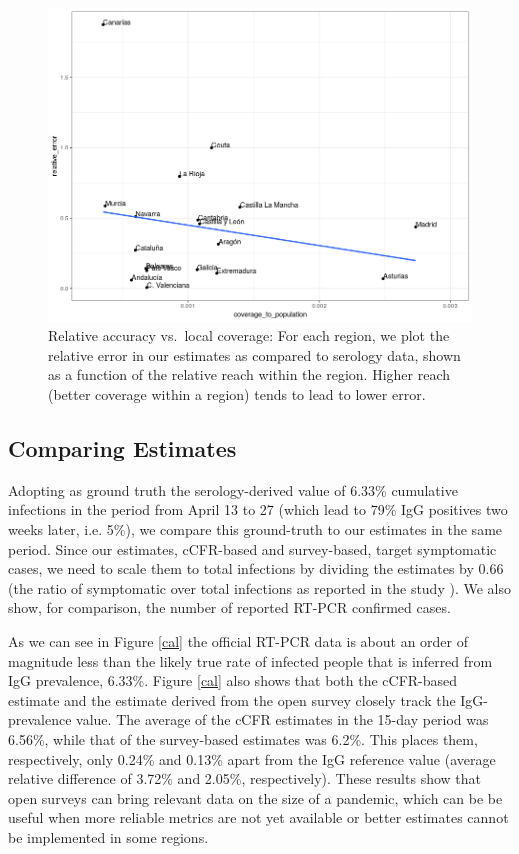 \documentclass{article}
\begin{document}
\begin{figure}[htb]
\begin{center}
\includegraphics[width=0.9\linewidth]{covr1.png}
\end{center}
\caption{Relative accuracy vs.~local coverage: For each region, we plot the relative error in our estimates as compared to serology data, shown as a function of the relative reach within the region. Higher reach (better coverage within a region) tends to lead to lower error. }
\label{fig:coverage-vs-accuracy}
\end{figure}

\subsection{Comparing Estimates}
\label{s-comparison}

Adopting as ground truth the serology-derived value of 6.33\% cumulative infections in the period from April 13 to 27 (which lead to 79\% IgG positives two weeks later, i.e. 5\%), we compare this ground-truth to our estimates in the same period. Since our estimates, cCFR-based and survey-based, target symptomatic cases, we need to scale them to total infections by dividing the estimates by 0.66 (the ratio of symptomatic over total infections as reported in the study \cite{ENEcovid19}). We also show, for comparison, the number of reported RT-PCR confirmed cases.

As we can see in Figure \ref{cal} the official RT-PCR data is about an order of magnitude less than the likely true rate of infected people that is inferred from IgG prevalence, 6.33\%. Figure \ref{cal} also shows that both the cCFR-based estimate and the estimate derived from the open survey closely track the IgG-prevalence value. 
% 
The average of the cCFR estimates in the 15-day period was 6.56\%, while that of the survey-based estimates was 6.2\%. This places them, respectively, only 0.24\% and 0.13\% apart from the IgG reference value (average relative difference of 3.72\% and 2.05\%, respectively). These results show that open surveys can bring relevant data on the size of a pandemic, which can be be useful when more reliable metrics are not yet available or better estimates cannot be implemented in some regions. 
\end{document}
